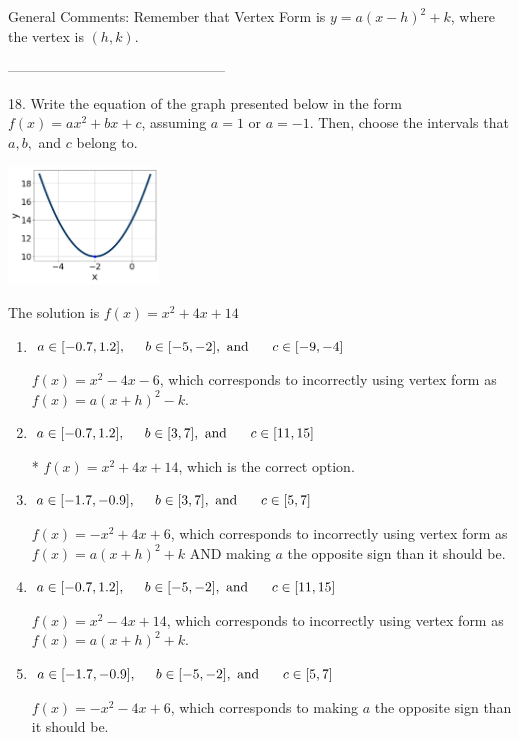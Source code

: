 \documentclass{article}[14pt]
\begin{document}
General Comments: Remember that Vertex Form is $y = a(x-h)^2+k$, where the vertex is $(h, k)$.

-----------------------------------------------

18. Write the equation of the graph presented below in the form $f(x)=ax^2+bx+c$, assuming  $a=1$ or $a=-1$. Then, choose the intervals that $a, b,$ and $c$ belong to.
\begin{center} \includegraphics[width=0.3\textwidth]{../Figures/quadraticGraphToEquationB.png} \end{center} 

The solution is $ f(x) = x^{2} +4 x + 14 $ 

\begin{enumerate}[label=\Alph*.] 
\item $ a \in [-0.7, 1.2], \hspace*{5mm} b \in [-5, -2], \text{ and } \hspace*{5mm} c \in [-9, -4] $ 

 $f(x)=x^{2} -4 x -6$, which corresponds to incorrectly using vertex form as $f(x) = a(x+h)^2 - k$. 
\item $ a \in [-0.7, 1.2], \hspace*{5mm} b \in [3, 7], \text{ and } \hspace*{5mm} c \in [11, 15] $ 

 * $f(x)=x^{2} +4 x + 14$, which is the correct option. 
\item $ a \in [-1.7, -0.9], \hspace*{5mm} b \in [3, 7], \text{ and } \hspace*{5mm} c \in [5, 7] $ 

 $f(x)=-x^{2} +4 x + 6$, which corresponds to incorrectly using vertex form as $f(x) = a(x+h)^2+k$ AND making $a$ the opposite sign than it should be. 
\item $ a \in [-0.7, 1.2], \hspace*{5mm} b \in [-5, -2], \text{ and } \hspace*{5mm} c \in [11, 15] $ 

 $f(x)=x^{2} -4 x + 14$, which corresponds to incorrectly using vertex form as $f(x) = a(x+h)^2+k$. 
\item $ a \in [-1.7, -0.9], \hspace*{5mm} b \in [-5, -2], \text{ and } \hspace*{5mm} c \in [5, 7] $ 

 $f(x)=-x^{2} -4 x + 6$, which corresponds to making $a$ the opposite sign than it should be. 
\end{enumerate} 
 
\end{document}
